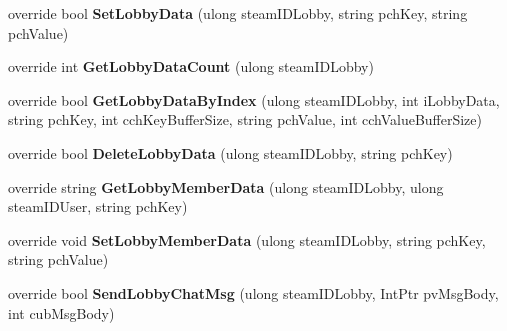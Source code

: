 \begin{DoxyCompactItemize}
\item 
\mbox{\label{class_valve_1_1_steamworks_1_1_c_steam_matchmaking_a5162a2768bdb0ec3f13d8cb082bb2797}} 
override bool {\bfseries Set\+Lobby\+Data} (ulong steam\+I\+D\+Lobby, string pch\+Key, string pch\+Value)
\item 
\mbox{\label{class_valve_1_1_steamworks_1_1_c_steam_matchmaking_ad75f519d43c37280e5d446db196ca586}} 
override int {\bfseries Get\+Lobby\+Data\+Count} (ulong steam\+I\+D\+Lobby)
\item 
\mbox{\label{class_valve_1_1_steamworks_1_1_c_steam_matchmaking_aba49c32e4332b374db1dcaa5b960b8ba}} 
override bool {\bfseries Get\+Lobby\+Data\+By\+Index} (ulong steam\+I\+D\+Lobby, int i\+Lobby\+Data, string pch\+Key, int cch\+Key\+Buffer\+Size, string pch\+Value, int cch\+Value\+Buffer\+Size)
\item 
\mbox{\label{class_valve_1_1_steamworks_1_1_c_steam_matchmaking_a455af6b208aaea58081859628a107797}} 
override bool {\bfseries Delete\+Lobby\+Data} (ulong steam\+I\+D\+Lobby, string pch\+Key)
\item 
\mbox{\label{class_valve_1_1_steamworks_1_1_c_steam_matchmaking_a146ecd606c3ba777e37f3677016ff395}} 
override string {\bfseries Get\+Lobby\+Member\+Data} (ulong steam\+I\+D\+Lobby, ulong steam\+I\+D\+User, string pch\+Key)
\item 
\mbox{\label{class_valve_1_1_steamworks_1_1_c_steam_matchmaking_ae92ee6b1633525f168c0503c96350db7}} 
override void {\bfseries Set\+Lobby\+Member\+Data} (ulong steam\+I\+D\+Lobby, string pch\+Key, string pch\+Value)
\item 
\mbox{\label{class_valve_1_1_steamworks_1_1_c_steam_matchmaking_a997486a86f2ded36c11f42babe2d7bdb}} 
override bool {\bfseries Send\+Lobby\+Chat\+Msg} (ulong steam\+I\+D\+Lobby, Int\+Ptr pv\+Msg\+Body, int cub\+Msg\+Body)
\item 
\mbox{\label{class_valve_1_1_steamworks_1_1_c_steam_matchmaking_ad7163499d9454d76a8f23bef413f0b8b}} 

\end{DoxyCompactItemize}
